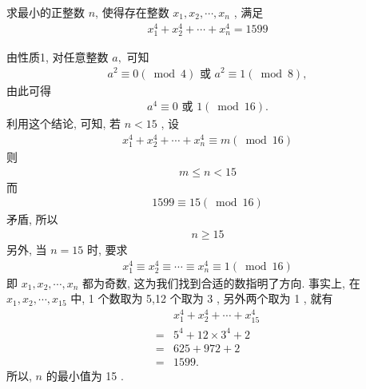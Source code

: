 \begin{example}
	求最小的正整数 $n$, 使得存在整数 $x_{1}, x_{2}, \cdots, x_{n}$ , 满足
	\begin{align*}
		x_{1}^{4}+x_{2}^{4}+\cdots+x_{n}^{4}=1599
	\end{align*}
\end{example}
\begin{solution}
	由性质1, 对任意整数 $a , $ 可知
	\begin{align*}
		a^{2} \equiv 0(\bmod 4) \text { 或 } a^{2} \equiv 1(\bmod 8),
	\end{align*}
	由此可得
	\begin{align*}
		a^{4} \equiv 0 \text { 或 } 1(\bmod 16) .
	\end{align*}
	利用这个结论, 可知, 若 $n<15$ , 设
	\begin{align*}
		x_{1}^{4}+x_{2}^{4}+\cdots+x_{n}^{4} \equiv m(\bmod 16)
	\end{align*}
	则
	\begin{align*}
		m \leqslant n<15
	\end{align*}
	而
	\begin{align*}
		1599 \equiv 15(\bmod 16)
	\end{align*}
	矛盾, 所以
	\begin{align*}
		n \geqslant 15
	\end{align*}
	另外, 当 $n=15$ 时, 要求
	\begin{align*}
		x_{1}^{4} \equiv x_{2}^{4} \equiv \cdots \equiv x_{n}^{4} \equiv 1(\bmod 16)
	\end{align*}
	即 $x_{1}, x_{2}, \cdots, x_{n}$ 都为奇数, 这为我们找到合适的数指明了方向. 事实上, 在 $x_{1}, x_{2}, \cdots, x_{15}$ 中, 1 个数取为 5,12 个取为 3 , 另外两个取为 1 , 就有
	\begin{align*}
		  & x_{1}^{4}+x_{2}^{4}+ \cdots +x_{15}^{4} \\
		= & 5^{4}+12 \times 3^{4}+2                 \\
		= & 625+972+2                               \\
		= & 1599 .
	\end{align*}
	所以, $n$ 的最小值为 15 .
\end{solution}

